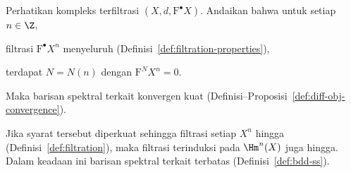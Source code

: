 \begin{theorem}\label{prop:classical-convergence}
	Perhatikan kompleks terfiltrasi $(X,d,\mathrm{F}^\bullet X)$. Andaikan
	bahwa untuk setiap $n\in\Z$,
	\begin{compactitem}
		\item filtrasi $\mathrm{F}^\bullet X^n$ menyeluruh
		(Definisi~\ref{def:filtration-properties}),
		\item terdapat $N=N(n)$ dengan $\mathrm{F}^NX^n=0$.
	\end{compactitem}
	Maka barisan spektral terkait konvergen kuat
	(Definisi--Proposisi~\ref{def:diff-obj-convergence}).

	Jika syarat tersebut diperkuat sehingga filtrasi setiap $X^n$ hingga
	(Definisi~\ref{def:filtration}), maka filtrasi terinduksi pada $\Hm^n(X)$
	juga hingga. Dalam keadaan ini barisan spektral terkait terbatas
	(Definisi~\ref{def:bdd-ss}).
\end{theorem}
